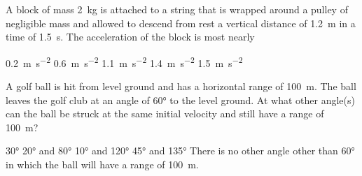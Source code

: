 \documentclass{../../../oss-ap12ibhl-print}
\begin{document}
\begin{questions}
  \question A block of mass \SI{2}{\kilo\gram} is attached to a string that is
  wrapped around a pulley of negligible mass and allowed to descend from rest
  a vertical distance of \SI{1.2}{\metre} in a time of \SI{1.5}{\second}. The
  acceleration of the block is most nearly

  \begin{minipage}{.28\linewidth}
  \end{minipage}
  \begin{minipage}{.3\linewidth}
    \begin{choices}
      \choice\SI{0.2}{\metre\per\second\squared}
      \choice\SI{.6} {\metre\per\second\squared}
      \choice\SI{1.1}{\metre\per\second\squared}
      \choice\SI{1.4}{\metre\per\second\squared}
      \choice\SI{1.5}{\metre\per\second\squared}
    \end{choices}
  \end{minipage}

%  
  
  \question A golf ball is hit from level ground and has a horizontal range of
  \SI{100}{\metre}. The ball leaves the golf club at an angle of \ang{60} to
  the level ground. At what other angle(s) can the ball be struck at the same
  initial velocity and still have a range of \SI{100}{\metre}?

  \begin{minipage}{.38\linewidth}
  \end{minipage}
  \begin{minipage}{.61\linewidth}
    \begin{choices}
      \choice\ang{30}
      \choice\ang{20} and \ang{80}
      \choice\ang{10} and \ang{120}
      \choice\ang{45} and \ang{135}
      \choice There is no other angle other than \ang{60} in which the ball
      will have a range of \SI{100}{\metre}.
    \end{choices}
  \end{minipage}
  

\end{questions}
\end{document}

